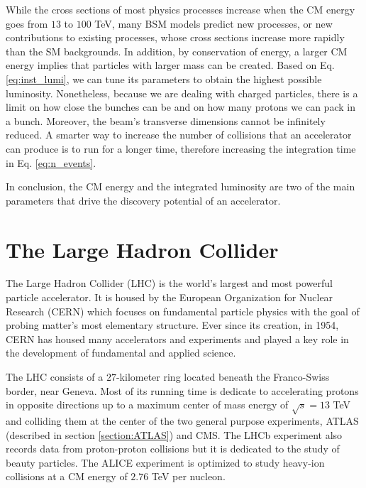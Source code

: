 While the cross sections of most physics processes increase when the CM energy goes from $13$ to $100$ TeV, many BSM models predict new processes, or new contributions to existing processes, whose cross sections increase more rapidly than the SM backgrounds. In addition, by conservation of energy, a larger CM energy implies that particles with larger mass can be created. Based on Eq. \ref{eq:inst_lumi}, we can tune its parameters to obtain the highest possible luminosity. Nonetheless, because we are dealing with charged particles, there is a limit on how close the bunches can be and on how many protons we can pack in a bunch. Moreover, the beam's transverse dimensions cannot be infinitely reduced. A smarter way to increase the number of collisions that an accelerator can produce is to run for a longer time, therefore increasing the integration time in Eq. \ref{eq:n_events}. 

In conclusion, the CM energy and the integrated luminosity are two of the main parameters that drive the discovery potential of an accelerator. 


\section{The Large Hadron Collider}
\label{section:LHC}

%


The Large Hadron Collider (LHC) is the world's largest and most powerful particle accelerator. It is housed by the European Organization for Nuclear Research (CERN) which focuses on fundamental particle physics with the goal of probing matter's most elementary structure. Ever since its creation, in 1954, CERN has housed many accelerators and experiments and played a key role in the development of fundamental and applied science.


The LHC consists of a $27$-kilometer ring located beneath the Franco-Swiss border, near Geneva. Most of its running time is dedicate to accelerating protons in opposite directions up to a maximum center of mass energy of $\sqrt{s}=13$ TeV and colliding them at the center of the two general purpose experiments, ATLAS (described in section \ref{section:ATLAS}) and CMS. The LHCb experiment also records data from proton-proton collisions but it is dedicated to the study of beauty particles. The ALICE experiment is optimized to study heavy-ion collisions at a CM energy of $2.76$ TeV per nucleon.

